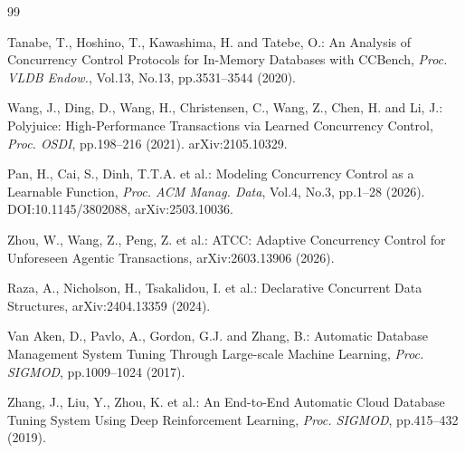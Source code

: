 \documentclass[submit,techrep,noauthor]{ipsj}
\begin{document}
\begin{thebibliography}{99}

Tanabe, T., Hoshino, T., Kawashima, H. and Tatebe, O.: An Analysis of Concurrency Control Protocols for In-Memory Databases with CCBench, {\it Proc. VLDB Endow.}, Vol.13, No.13, pp.3531--3544 (2020).

Wang, J., Ding, D., Wang, H., Christensen, C., Wang, Z., Chen, H. and Li, J.: Polyjuice: High-Performance Transactions via Learned Concurrency Control, {\it Proc. OSDI}, pp.198--216 (2021). arXiv:2105.10329.

Pan, H., Cai, S., Dinh, T.T.A. et al.: Modeling Concurrency Control as a Learnable Function, {\it Proc. ACM Manag. Data}, Vol.4, No.3, pp.1--28 (2026). DOI:10.1145/3802088, arXiv:2503.10036.

Zhou, W., Wang, Z., Peng, Z. et al.: ATCC: Adaptive Concurrency Control for Unforeseen Agentic Transactions, arXiv:2603.13906 (2026).

Raza, A., Nicholson, H., Tsakalidou, I. et al.: Declarative Concurrent Data Structures, arXiv:2404.13359 (2024).

Van Aken, D., Pavlo, A., Gordon, G.J. and Zhang, B.: Automatic Database Management System Tuning Through Large-scale Machine Learning, {\it Proc. SIGMOD}, pp.1009--1024 (2017).

Zhang, J., Liu, Y., Zhou, K. et al.: An End-to-End Automatic Cloud Database Tuning System Using Deep Reinforcement Learning, {\it Proc. SIGMOD}, pp.415--432 (2019).


\end{thebibliography}
\end{document}
